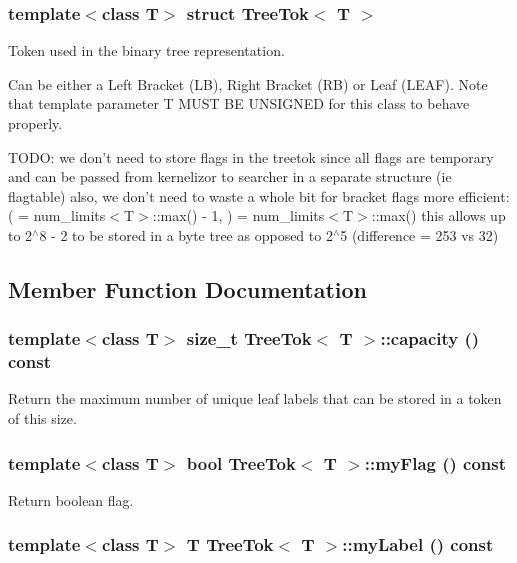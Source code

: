 \subsubsection*{template$<$class T$>$ struct Tree\-Tok$<$ T $>$}

Token used in the binary tree representation. 

Can be either a Left Bracket (LB), Right Bracket (RB) or Leaf (LEAF). Note that template parameter T MUST BE UNSIGNED for this class to behave properly.

TODO: we don't need to store flags in the treetok since all flags are temporary and can be passed from kernelizor to searcher in a separate structure (ie flagtable) also, we don't need to waste a whole bit for bracket flags more efficient: ( = num\_\-limits$<$T$>$::max() - 1, ) = num\_\-limits$<$T$>$::max() this allows up to 2$^\wedge$8 - 2 to be stored in a byte tree as opposed to 2$^\wedge$5 (difference = 253 vs 32) 



\subsection{Member Function Documentation}
\subsubsection{\setlength{\rightskip}{0pt plus 5cm}template$<$class T$>$ size\_\-t {\bf Tree\-Tok}$<$ T $>$::capacity () const\hspace{0.3cm}{\tt  [inline]}}\label{structTreeTok_a8}


Return the maximum number of unique leaf labels that can be stored in a token of this size. 

\subsubsection{\setlength{\rightskip}{0pt plus 5cm}template$<$class T$>$ bool {\bf Tree\-Tok}$<$ T $>$::my\-Flag () const\hspace{0.3cm}{\tt  [inline]}}\label{structTreeTok_a2}


Return boolean flag. 

\subsubsection{\setlength{\rightskip}{0pt plus 5cm}template$<$class T$>$ T {\bf Tree\-Tok}$<$ T $>$::my\-Label () const\hspace{0.3cm}{\tt  [inline]}}\label{structTreeTok_a1}


